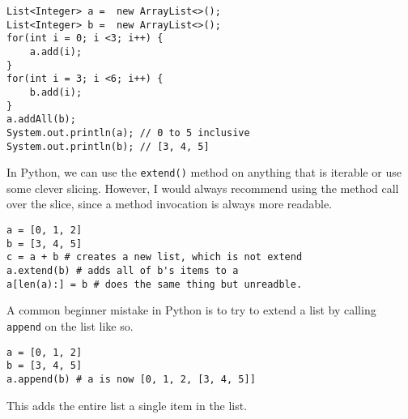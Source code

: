 \begin{verbatim}
List<Integer> a =  new ArrayList<>();
List<Integer> b =  new ArrayList<>();
for(int i = 0; i <3; i++) { 
	a.add(i); 
}
for(int i = 3; i <6; i++) { 
	b.add(i); 
}
a.addAll(b);
System.out.println(a); // 0 to 5 inclusive
System.out.println(b); // [3, 4, 5]
\end{verbatim}

In Python, we can use the \texttt{extend()} method on anything that is iterable or use some clever slicing.  However, I would always recommend using the method call over the slice, since a method invocation is always more readable.


\begin{verbatim}
a = [0, 1, 2]
b = [3, 4, 5]
c = a + b # creates a new list, which is not extend
a.extend(b) # adds all of b's items to a
a[len(a):] = b # does the same thing but unreadble.
\end{verbatim}
A common beginner mistake in Python is to try to extend a list by calling \texttt{append} on the list like so.

\begin{verbatim}
a = [0, 1, 2]
b = [3, 4, 5]
a.append(b) # a is now [0, 1, 2, [3, 4, 5]]
\end{verbatim}



This adds the entire list a single item in the list.  